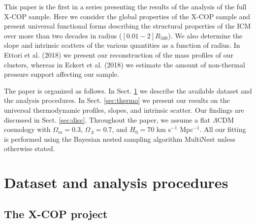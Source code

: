 \documentclass[traditabstract   ]{aa} %
\begin{document}
This paper is the first in a series presenting the results of the analysis of the full X-COP sample. Here we consider the global properties of the X-COP sample and present universal functional forms describing the structural properties of the ICM over more than two decades in radius ($[0.01-2]R_{500}$). We also determine the slope and intrinsic scatters of the various quantities as a function of radius. In Ettori et al. (2018) we present our reconstruction of the mass profiles of our clusters, whereas in Eckert et al. (2018) we estimate the amount of non-thermal pressure support affecting our sample.

The paper is organized as follows. In Sect. \ref{sec:data} we describe the available dataset and the analysis procedures. In Sect. \ref{sec:thermo} we present our results on the universal thermodynamic profiles, slopes, and intrinsic scatter. Our findings are discussed in Sect. \ref{sec:disc}. Throughout the paper, we assume a flat $\Lambda$CDM cosmology with $\Omega_m=0.3$, $\Omega_\Lambda=0.7$, and $H_{0}=70$ km s$^{-1}$ Mpc$^{-1}$. All our fitting is performed using the Bayesian nested sampling algorithm MultiNest \citep{multinest} unless otherwise stated. 

\section{Dataset and analysis procedures}
\label{sec:data}


\subsection{The X-COP project}
\end{document}
